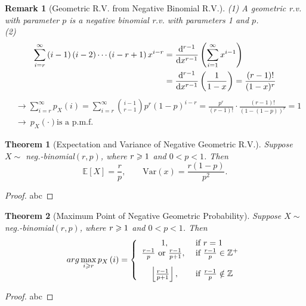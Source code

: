 \documentclass[openany,12pt]{book}
\newtheorem{theorem}{Theorem}[chapter]
\newtheorem{remark}{Remark}[chapter]
\begin{document}
\begin{remark}[Geometric R.V. from Negative Binomial R.V.]
(1) A geometric r.v. with parameter $p$ is a negative binomial r.v. with parameters 1 and $p$.\\
(2)
$$
\begin{aligned}
\sum_{i=r}^{\infty}\left(i-1\right)\left(i-2\right)\cdots\left(i-r+1\right)x^{i-r}&=\frac{\mathrm{d}^{r-1}}{\mathrm{d} x^{r-1}}\left(\sum_{i=1}^{\infty}x^{i-1}\right)\\
&=\frac{\mathrm{d}^{r-1}}{\mathrm{d} x^{r-1}}\left(\frac{1}{1-x}\right)=\frac{\left(r-1\right)!}{(1-x)^r}\\
\end{aligned}
$$
$$
\begin{aligned}
&\to\sum_{i=r}^{\infty}{p_X\left(i\right)}=\sum_{i=r}^{\infty}{\binom{i-1}{r-1}p^r(1-p)^{i-r}}=\frac{p^r}{\left(r-1\right)!}\cdot\frac{\left(r-1\right)!}{(1-(1-p))^r}=1\\
   &\to\ p_X\left(\cdot\right) \text{is a p.m.f.}
   \end{aligned}
$$
\end{remark}

\begin{theorem}[Expectation and Variance of Negative Geometric R.V.]
Suppose $X\sim$ neg.-binomial$(r,p)$, where $r\geqslant1$ and $0<p<1$. Then
$$
\mathbb{E}\left[X\right]=\frac{r}{p},\qquad
\mathrm{Var}(x)=\frac{r(1-p)}{p^2}.
$$
\end{theorem}

\begin{proof}
  abc
\end{proof}

\begin{theorem}[Maximum Point of Negative Geometric Probability]
Suppose $X\sim$ neg.-binomial$(r,p)$, where $r\geqslant1$ and $0<p<1$. Then
$$
arg\max_{i\gs r}p_X\left(i\right)=
\left\{\begin{array}{cl}                
1,                             &\text{if } r=1\\
\frac{r-1}{p}\ \text{or } \frac{r-1}{p+1},\  &\text{if } \frac{r-1}{p}\in\mz^+\vspace{0.3cm}\\
\left\lfloor\frac{r-1}{p+1}\right\rfloor,               &\text{if } \frac{r-1}{p}\notin\mz     
\end{array}
\right.
$$
\end{theorem}

\begin{proof}
  abc
\end{proof}
\end{document}
